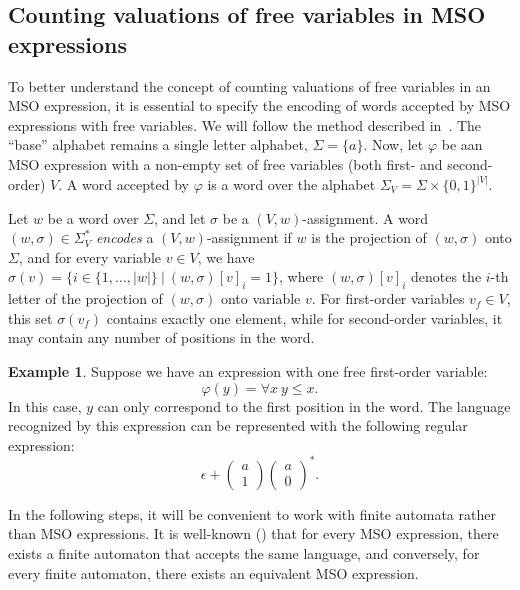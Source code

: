 \documentclass[12pt]{article}
\newcommand{\icol}[1]{%
  \left(\begin{smallmatrix}#1\end{smallmatrix}\right)%
}
\theoremstyle{definition}
\newtheorem{example}{Example}[section]
\begin{document}
\subsection{Counting valuations of free variables in MSO expressions}

To better understand the concept of counting valuations of free variables in an MSO expression, it is essential to specify the encoding of words accepted by MSO expressions with free variables. We will follow the method described in~\cite{KreutzerR13}. The ``base'' alphabet remains a single letter alphabet, $\Sigma = \{a\}$. Now, let $\varphi$ be aan MSO expression with a non-empty set of free variables (both first- and second-order) $V$. A word accepted by $\varphi$ is a word over the alphabet $\Sigma_V = \Sigma \times \{0, 1\}^{|V|}$. 

Let $w$ be a word over $\Sigma$, and let $\sigma$ be a $(V, w)$-assignment. A word $(w, \sigma) \in \Sigma_V^*$ \emph{encodes} a $(V, w)$-assignment if $w$ is the projection of $(w, \sigma)$ onto $\Sigma$, and for every variable $v \in V$, we have $\sigma(v) = \{i \in \{1,\ldots,|w|\} \ | \ (w, \sigma)[v]_i = 1 \}$, where $(w, \sigma)[v]_i$ denotes the $i$-th letter of the projection of $(w, \sigma)$ onto variable $v$. For first-order variables $v_f \in V$, this set $\sigma(v_f)$ contains exactly one element, while for second-order variables, it may contain any number of positions in the word.

\begin{example}
    Suppose we have an expression with one free first-order variable:
    $$\varphi(y) = \forall x \ y \leq x.$$
    In this case, $y$ can only correspond to the first position in the word. The language recognized by this expression can be represented with the following regular expression: 
    $$\epsilon + \icol{a\\1}\icol{a\\0}^*.$$
\end{example}

In the following steps, it will be convenient to work with finite automata rather than MSO expressions. It is well-known (\cite{Buchi1960}) that for every MSO expression, there exists a finite automaton that accepts the same language, and conversely, for every finite automaton, there exists an equivalent MSO expression.
\end{document}
